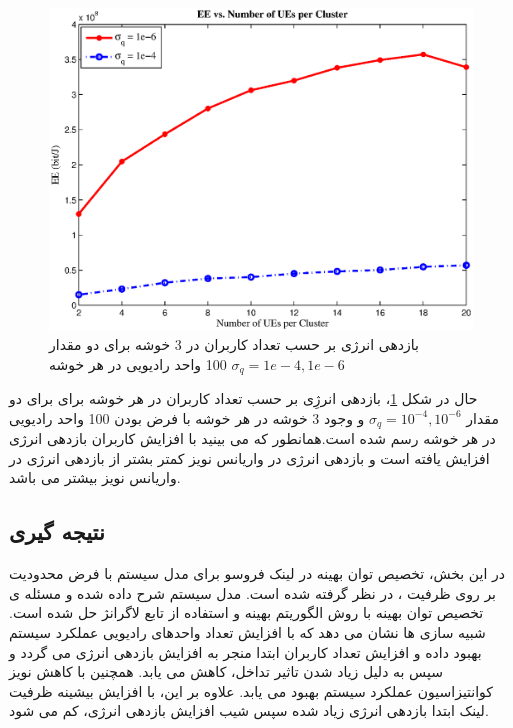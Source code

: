  \begin{figure}[H]
  \centering
    \includegraphics[width=\linewidth]{./fig3/varUE}
  \caption{  بازدهی انرژی بر حسب تعداد کاربران در 3 خوشه  برای دو مقدار 
  $\sigma_q = 1e-4 , 1e-6$
   100 واحد رادیویی
   در هر خوشه}
  \label{fig:Var}
\end{figure}
 حال در شکل \ref{fig:Var}، بازدهی انرژِی بر حسب تعداد کاربران در هر خوشه  برای برای دو مقدار 
  $\sigma_q = 10^{-4} , 10^{-6}$
   و وجود 3 خوشه در هر خوشه با فرض بودن  100 واحد رادیویی در هر خوشه رسم شده است.همانطور که می بینید با افزایش کاربران بازدهی انرژی افزایش یافته است و بازدهی انرژی در واریانس نویز کمتر بشتر از بازدهی انرژی در واریانس نویز بیشتر می باشد.
\subsection{نتیجه گیری}
در این بخش، تخصیص توان بهینه در لینک فروسو برای مدل سیستم  با فرض محدودیت بر روی ظرفیت ، در نظر گرفته شده است. مدل سیستم شرح داده شده و مسئله ی تخصیص توان بهینه با روش الگوریتم بهینه و استفاده از تابع لاگرانژ حل شده است. شبیه سازی ها نشان می دهد که با افزایش تعداد واحدهای رادیویی عملکرد سیستم بهبود داده و افزایش تعداد کاربران ابتدا منجر به افزایش بازدهی انرژی می گردد و سپس به دلیل زیاد شدن تاثیر تداخل،  کاهش می یابد. همچنین با کاهش نویز کوانتیزاسیون عملکرد سیستم بهبود می یابد. علاوه بر این، با افزایش  بیشینه ظرفیت لینک  ابتدا بازدهی انرژی زیاد شده سپس شیب افزایش بازدهی انرژی، کم می شود.
